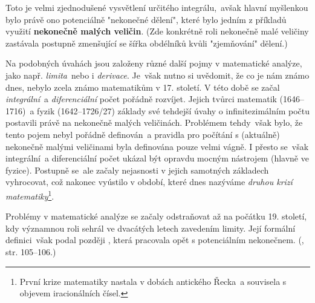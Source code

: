 Toto je velmi zjednodušené vysvětlení určitého integrálu,~avšak hlavní myšlenkou bylo právě ono potenciálně "nekonečné dělení", které bylo jedním z příkladů využití \textbf{nekonečně malých veličin}. (Zde konkrétně roli nekonečně malé veličiny zastávala postupně zmenšující se šířka obdélníků kvůli "zjemňování" dělení.)\par
Na podobných úvahách jsou založeny různé další pojmy v matematické analýze, jako např. \emph{limita}~nebo i \emph{derivace}. Je~však nutno si uvědomit, že co je nám známo dnes, nebylo zcela známo matematikům v 17. století. V této době se začal \emph{integrální}~a \emph{diferenciální} počet pořádně rozvíjet. Jejich tvůrci matematik  (1646--1716)~a fyzik  (1642--1726/27) základy své tehdejší úvahy o infinitezimálním počtu postavili právě na nekonečně malých veličinách. Problémem tehdy~však bylo, že tento pojem nebyl pořádně definován~a pravidla pro počítání s (aktuálně) nekonečně malými veličinami byla definována pouze velmi vágně. I přesto se~však integrální~a diferenciální počet ukázal být opravdu mocným nástrojem (hlavně ve fyzice). Postupně se~ale začaly nejasnosti v jejich samotných základech vyhrocovat, což nakonec vyústilo v období, které dnes nazýváme \emph{druhou krizí matematiky}\footnote{První krize matematiky nastala v dobách antického Řecka~a souvisela s objevem iracionálních čísel.}.\par
Problémy v matematické analýze se začaly odstraňovat až na počátku 19. století, kdy významnou roli sehrál ve dvacátých letech  zavedením limity. Její formální definici~však podal později , která pracovala opět s potenciálním nekonečnem. (\cite{Fuchs2003}, str. 105--106.)